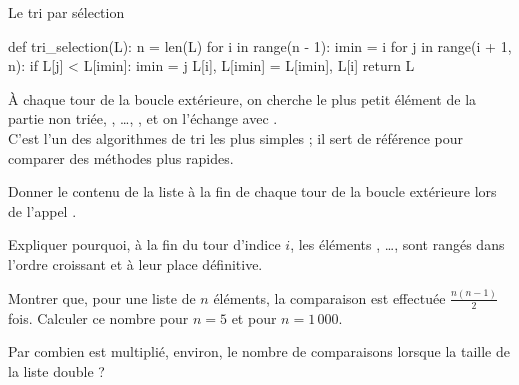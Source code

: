 \begin{exercice}[3]{Le tri par sélection}
\begin{codecote}[0.55]
\begin{pythoncol}
def tri_selection(L):
    n = len(L)
    for i in range(n - 1):
        imin = i
        for j in range(i + 1, n):
            if L[j] < L[imin]:
                imin = j
        L[i], L[imin] = L[imin], L[i]
    return L
\end{pythoncol}
\cote
À chaque tour de la boucle extérieure, on cherche le plus petit élément de la partie non triée, , …, , et on
l'échange avec .\\[1mm]
C'est l'un des algorithmes de tri les plus simples ; il sert de référence pour comparer des méthodes plus rapides.
\end{codecote}
\begin{questions}
  \item Donner le contenu de la liste à la fin de chaque tour de la boucle extérieure lors de l'appel
    .
  \item Expliquer pourquoi, à la fin du tour d'indice $i$, les éléments , …,  sont rangés dans l'ordre
    croissant et à leur place définitive.
  \item Montrer que, pour une liste de $n$ éléments, la comparaison  est effectuée $\frac{n(n-1)}{2}$ fois.
    Calculer ce nombre pour $n=5$ et pour $n=1\,000$.
  \item Par combien est multiplié, environ, le nombre de comparaisons lorsque la taille de la liste double ?
\end{questions}
\end{exercice}

